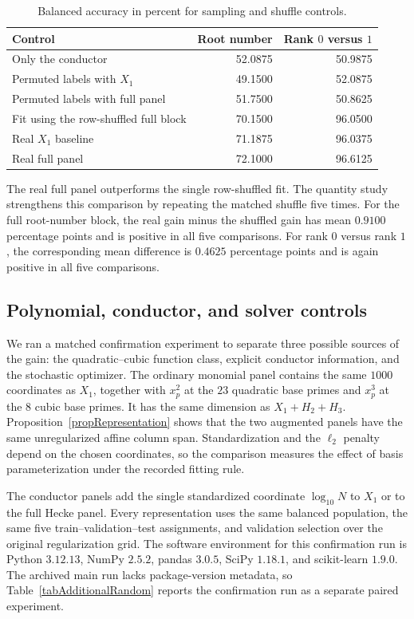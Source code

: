 \documentclass[12pt,reqno]{amsart}
\numberwithin{equation}{section}
\theoremstyle{plain}
\theoremstyle{definition}
\theoremstyle{remark}
\begin{document}
\begin{table}[H]
\centering
\caption{Balanced accuracy in percent for sampling and shuffle
controls.}
\label{tabControls}
\begin{tabular}{lrr}
\toprule
Control & Root number & Rank $0$ versus $1$\\
\midrule
Only the conductor & 52.0875 & 50.9875\\
Permuted labels with $X_1$ & 49.1500 & 52.0875\\
Permuted labels with full panel & 51.7500 & 50.8625\\
Fit using the row-shuffled full block & 70.1500 & 96.0500\\
Real $X_1$ baseline & 71.1875 & 96.0375\\
Real full panel & 72.1000 & 96.6125\\
\bottomrule
\end{tabular}
\end{table}

The real full panel outperforms the single row-shuffled fit.
The quantity study strengthens this comparison by repeating the matched shuffle five times.
For the full root-number block, the real gain minus the shuffled gain has mean $0.9100$ percentage points and is positive in all five comparisons.
For rank $0$ versus rank $1$, the corresponding mean difference is $0.4625$ percentage points and is again positive in all five comparisons.

\FloatBarrier

\subsection{Polynomial, conductor, and solver controls}
\label{secAdditionalControls}

We ran a matched confirmation experiment to separate three possible sources of the gain: the quadratic--cubic function class, explicit conductor information, and the stochastic optimizer.
The ordinary monomial panel contains the same $1000$ coordinates as $X_1$, together with $x_p^2$ at the $23$ quadratic base primes and $x_p^3$ at the $8$ cubic base primes.
It has the same dimension as $X_1+H_2+H_3$.
Proposition~\ref{propRepresentation} shows that the two augmented panels have the same unregularized affine column span.
Standardization and the $\ell_2$ penalty depend on the chosen coordinates, so the comparison measures the effect of basis parameterization under the recorded fitting rule.

The conductor panels add the single standardized coordinate $\log_{10}N$ to $X_1$ or to the full Hecke panel.
Every representation uses the same balanced population, the same five train--validation--test assignments, and validation selection over the original regularization grid.
The software environment for this confirmation run is Python $3.12.13$, NumPy $2.5.2$, pandas $3.0.5$, SciPy $1.18.1$, and scikit-learn $1.9.0$.
The archived main run lacks package-version metadata, so Table~\ref{tabAdditionalRandom} reports the confirmation run as a separate paired experiment.
\end{document}
